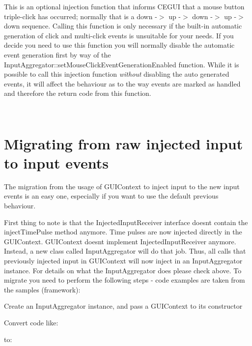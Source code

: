 This is an optional injection function that informs C\+E\+G\+UI that a mouse button triple-\/click has occurred; normally that is a down -\/$>$ up -\/$>$ down -\/$>$ up -\/$>$ down sequence. Calling this function is only necessary if the built-\/in automatic generation of click and multi-\/click events is unsuitable for your needs. If you decide you need to use this function you will normally disable the automatic event generation first by way of the Input\+Aggregator\+::set\+Mouse\+Click\+Event\+Generation\+Enabled function. While it is possible to call this injection function {\itshape without} disabling the auto generated events, it will affect the behaviour as to the way events are marked as \textquotesingle{}handled\textquotesingle{} and therefore the return code from this function.

~\newline
 \hypertarget{input_tutorial_input_tutorial_migration}{}\section{Migrating from raw injected input to input events}\label{input_tutorial_input_tutorial_migration}
The migration from the usage of G\+U\+I\+Context to inject input to the new input events is an easy one, especially if you want to use the default previous behaviour.

First thing to note is that the Injected\+Input\+Receiver interface doesn\textquotesingle{}t contain the inject\+Time\+Pulse method anymore. Time pulses are now injected directly in the G\+U\+I\+Context. G\+U\+I\+Context doesn\textquotesingle{}t implement Injected\+Input\+Receiver anymore. Instead, a new class called Input\+Aggregator will do that job. Thus, all calls that previously injected input in G\+U\+I\+Context will now inject in an Input\+Aggregator instance. For details on what the Input\+Aggregator does please check above. To migrate you need to perform the following steps -\/ code examples are taken from the samples (framework)\+:


\begin{DoxyItemize}
\item Create an Input\+Aggregator instance, and pass a G\+U\+I\+Context to its constructor 
\begin{DoxyCode}{0}
\end{DoxyCode}

\item Convert code like\+: 
\begin{DoxyCode}{0}
\end{DoxyCode}
 to\+: 
\begin{DoxyCode}{0}
\end{DoxyCode}

\end{DoxyItemize}

